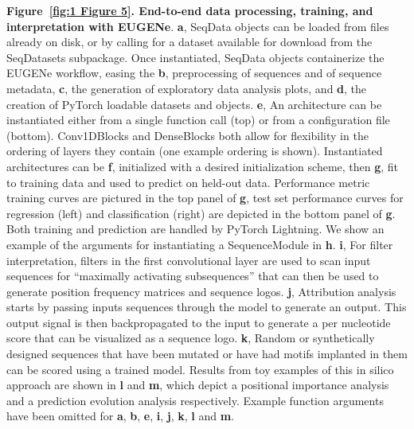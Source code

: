 \thispagestyle{plain}
\noindent
\textbf{Figure~\ref{fig:1 Figure 5}. End-to-end data processing, training, and interpretation with EUGENe}. \textbf{a}, SeqData objects can be loaded from files already on disk, or by calling for a dataset available for download from the SeqDatasets subpackage. Once instantiated, SeqData objects containerize the EUGENe workflow, easing the \textbf{b}, preprocessing of sequences and of sequence metadata, \textbf{c}, the generation of exploratory data analysis plots, and \textbf{d}, the creation of PyTorch loadable datasets and objects. \textbf{e}, An architecture can be instantiated either from a single function call (top) or from a configuration file (bottom). Conv1DBlocks and DenseBlocks both allow for flexibility in the ordering of layers they contain (one example ordering is shown). Instantiated architectures can be \textbf{f}, initialized with a desired initialization scheme, then \textbf{g}, fit to training data and used to predict on held-out data. Performance metric training curves are pictured in the top panel of \textbf{g}, test set performance curves for regression (left) and classification (right) are depicted in the bottom panel of \textbf{g}. Both training and prediction are handled by PyTorch Lightning. We show an example of the arguments for instantiating a SequenceModule in \textbf{h}. \textbf{i}, For filter interpretation, filters in the first convolutional layer are used to scan input sequences for “maximally activating subsequences” that can then be used to generate position frequency matrices and sequence logos. \textbf{j}, Attribution analysis starts by passing inputs sequences through the model to generate an output. This output signal is then backpropagated to the input to generate a per nucleotide score that can be visualized as a sequence logo. \textbf{k}, Random or synthetically designed sequences that have been mutated or have had motifs implanted in them can be scored using a trained model. Results from toy examples of this in silico approach are shown in \textbf{l} and \textbf{m}, which depict a positional importance analysis and a prediction evolution analysis respectively. Example function arguments have been omitted for \textbf{a}, \textbf{b}, \textbf{e}, \textbf{i}, \textbf{j}, \textbf{k}, \textbf{l} and \textbf{m}.

\clearpage

